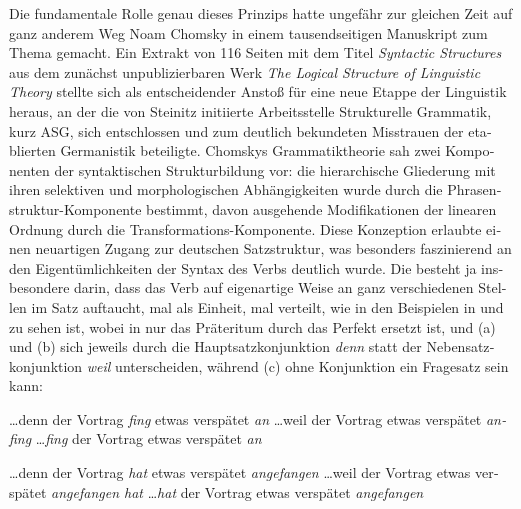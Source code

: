 \documentclass[output=paper,colorlinks,citecolor=brown]{langscibook}
\begin{document}
\begin{otherlanguage}{german}
Die fundamentale Rolle genau dieses Prinzips hatte ungefähr zur gleichen Zeit auf ganz anderem Weg Noam Chomsky in einem tausendseitigen Manuskript zum Thema gemacht. Ein Extrakt von 116 Seiten mit dem Titel \textit{Syntactic Structures} \citep{Chomsky1957} aus dem zunächst unpublizierbaren Werk \textit{The Logical Structure of Linguistic Theory} stellte sich als entscheidender Anstoß für eine neue Etappe der Linguistik heraus, an der die von Steinitz initiierte \glqq Arbeitsstelle Strukturelle Grammatik\grqq, kurz ASG, sich entschlossen und zum deutlich bekundeten Misstrauen der etablierten Germanistik beteiligte. Chomskys Grammatiktheorie sah zwei Komponenten der syntaktischen Strukturbildung vor: die hie\-rarchische Gliederung mit ihren selektiven und morphologischen Abhängigkeiten wurde durch die Phrasenstruktur-Komponente bestimmt, davon ausgehende Modifikationen der linearen Ordnung durch die Transformations-Komponente. Diese Konzeption erlaubte einen neuartigen Zugang zur deutschen Satzstruktur, was besonders faszinierend an den Eigentümlichkeiten der Syntax des Verbs deutlich wurde. Die besteht ja insbesondere darin, dass das Verb auf eigenartige Weise an ganz verschiedenen Stellen im Satz auftaucht, mal als Einheit, mal verteilt, wie in den Beispielen in  und  zu sehen ist, wobei in  nur das Präteritum durch das Perfekt ersetzt ist, und (a) und (b) sich jeweils durch die Hauptsatzkonjunktion \textit{denn} statt der Nebensatzkonjunktion \textit{weil} unterscheiden, während (c) ohne Konjunktion ein Fragesatz sein kann:

\ea
\ea \ldots denn der Vortrag \textit{fing} etwas verspätet \textit{an} \label{ex:2a}
\ex \ldots weil der Vortrag etwas verspätet \textit{anfing} \label{ex:2b}
\ex \ldots \textit{fing} der Vortrag etwas verspätet \textit{an} \label{ex:2c}
\z
\label{ex:2}
\z

\ea 
\ea \ldots denn der Vortrag \textit{hat} etwas verspätet \textit{angefangen} \label{ex:3a}
\ex \ldots weil der Vortrag etwas verspätet \textit{angefangen hat} \label{ex:3b}
\ex \ldots \textit{hat} der Vortrag etwas verspätet \textit{angefangen} \label{ex:3c}
\z
\label{ex:3}
\z


\end{otherlanguage}
\end{document}
